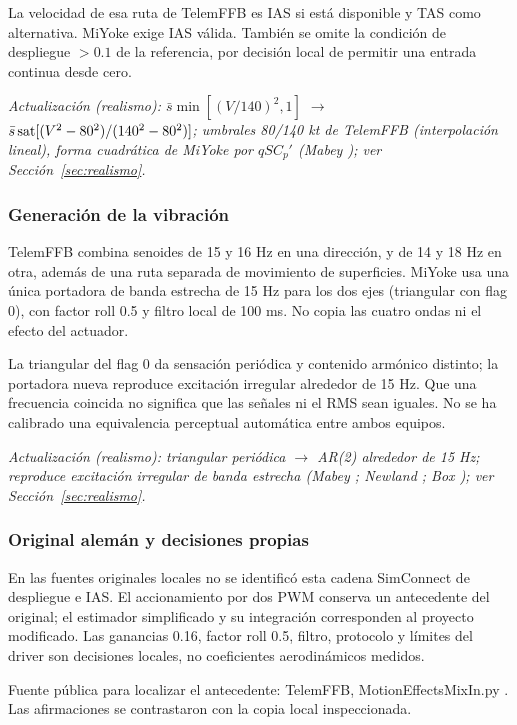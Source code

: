 La velocidad de esa ruta de TelemFFB es IAS si está disponible y TAS como alternativa. MiYoke exige IAS válida. También se omite la condición de despliegue $>0.1$ de la referencia, por decisión local de permitir una entrada continua desde cero.

\textit{Actualización (realismo): $\bar s\min[(V/140)^2,1]$ $\rightarrow$ $\bar s\operatorname{sat}[(V^2-80^2)/(140^2-80^2)]$; umbrales 80/140 kt de TelemFFB (interpolación lineal), forma cuadrática de MiYoke por $qSC_p'$ (Mabey \cite{mabey1988}); ver Sección~\ref{sec:realismo}.}

\subsubsection{Generación de la vibración}
TelemFFB combina senoides de 15 y 16 Hz en una dirección, y de 14 y 18 Hz en otra, además de una ruta separada de movimiento de superficies. MiYoke usa una única portadora de banda estrecha de 15 Hz para los dos ejes (triangular con flag 0), con factor roll 0.5 y filtro local de 100 ms. No copia las cuatro ondas ni el efecto del actuador.

La triangular del flag 0 da sensación periódica y contenido armónico distinto; la portadora nueva reproduce excitación irregular alrededor de 15 Hz. Que una frecuencia coincida no significa que las señales ni el RMS sean iguales. No se ha calibrado una equivalencia perceptual automática entre ambos equipos.

\textit{Actualización (realismo): triangular periódica $\rightarrow$ AR(2) alrededor de 15 Hz; reproduce excitación irregular de banda estrecha (Mabey \cite{mabey1988}; Newland \cite{newland1993}; Box \cite{box}); ver Sección~\ref{sec:realismo}.}

\subsubsection{Original alemán y decisiones propias}
En las fuentes originales locales no se identificó esta cadena SimConnect de despliegue e IAS. El accionamiento por dos PWM conserva un antecedente del original; el estimador simplificado y su integración corresponden al proyecto modificado. Las ganancias 0.16, factor roll 0.5, filtro, protocolo y límites del driver son decisiones locales, no coeficientes aerodinámicos medidos.

Fuente pública para localizar el antecedente: TelemFFB, MotionEffectsMixIn.py \cite{telemffb}. Las afirmaciones se contrastaron con la copia local inspeccionada.

